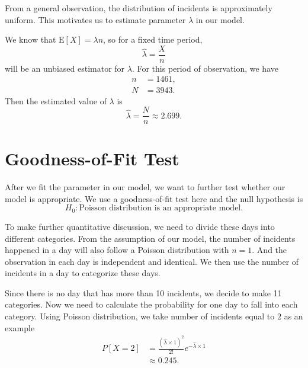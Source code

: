 \documentclass[11pt,a4paper,english]{article}
\begin{document}
From a general observation, the distribution of incidents is approximately uniform. This motivates us to estimate parameter $\lambda$ in our model.

We know that $\text{E}[X] = \lambda n$, so for a fixed time period,
\begin{equation*}
	\hat{\lambda} = \frac{X}{n}
\end{equation*}
will be an unbiased estimator for $\lambda$. For this period of observation, we have 
\begin{align*}
	n &= 1461,\\
	N &= 3943.
\end{align*}
Then the estimated value of $\lambda$ is
\begin{equation*}
	\hat{\lambda} = \frac{N}{n} \approx 2.699.
\end{equation*}

\section{Goodness-of-Fit Test}
After we fit the parameter in our model, we want to further test whether our model is appropriate. We use a goodness-of-fit test here and the null hypothesis is
\begin{equation*}
	H_{0}:\text{Poisson distribution is an appropriate model.}
\end{equation*}

To make further quantitative discussion, we need to divide these days into different categories. 
From the assumption of our model, the number of incidents happened in a day will also follow a Poisson distribution with $n = 1$. 
And the observation in each day is independent and identical. We then use the number of incidents in a day to categorize these days.

Since there is no day that has more than 10 incidents, we decide to make 11 categories. Now we need to calculate the probability for one day to fall into each category. Using Poisson distribution, we take number of incidents equal to $2$ as an example
\begin{align*}
	P[X = 2] &= \frac{\left(\hat{\lambda}\times 1\right)^{2}}{2!}
	e^{-\hat{\lambda} \times 1} \\
	&\approx 0.245.\\
\end{align*}
\end{document}
